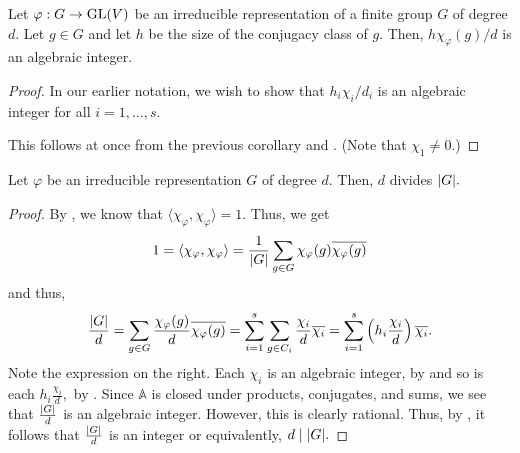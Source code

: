 \begin{thm} \label{thm:hchidisalgint}
	Let $\varphi : G \to \operatorname{GL}(V)$ be an irreducible representation of a finite group $G$ of degree $d.$ Let $g \in G$ and let $h$ be the size of the conjugacy class of $g.$ Then, $h\chi_\varphi(g)/d$ is an algebraic integer.
\end{thm}
\begin{proof}
	In our earlier notation, we wish to show that $h_i\chi_i/d_i$ is an algebraic integer for all $i = 1, \ldots, s.$

	This follows at once from the previous corollary and . (Note that $\chi_1 \neq 0.$)
\end{proof}

\begin{thm} \label{thm:dimthm}
	Let $\varphi$ be an irreducible representation $G$ of degree $d.$ Then, $d$ divides ${\left\lvert G \right\lvert}.$
\end{thm}
\begin{proof} 
	By , we know that $\langle \chi_\varphi, \chi_\varphi\rangle = 1.$ Thus, we get
	\begin{equation*} 
		1 = \langle \chi_\varphi, \chi_\varphi\rangle = \frac{1}{{\left\lvert G \right\lvert}} \sum_{g \in G} \chi_\varphi(g)\overline{\chi_\varphi(g)}
	\end{equation*}
	and thus,
	\begin{equation*} 
		\frac{{\left\lvert G \right\lvert}}{d} =  \sum_{g \in G} \frac{\chi_\varphi(g)}{d}\overline{\chi_\varphi(g)} = \sum_{i = 1}^{s}\sum_{g \in C_i} \frac{\chi_i}{d}\overline{\chi_i} = \sum_{i = 1}^{s}\left(h_i\frac{\chi_i}{d}\right)\overline{\chi_i}.
	\end{equation*}
	Note the expression on the right. Each $\chi_i$ is an algebraic integer, by  and so is each $h_i\frac{\chi_i}{d},$ by . Since $\mathbb{A}$ is closed under products, conjugates, and sums, we see that $\frac{{\left\lvert G \right\lvert}}{d}$ is an algebraic integer. However, this is clearly rational. Thus, by , it follows that $\frac{{\left\lvert G \right\lvert}}{d}$ is an integer or equivalently, $d \mid {\left\lvert G \right\lvert}.$
\end{proof}


